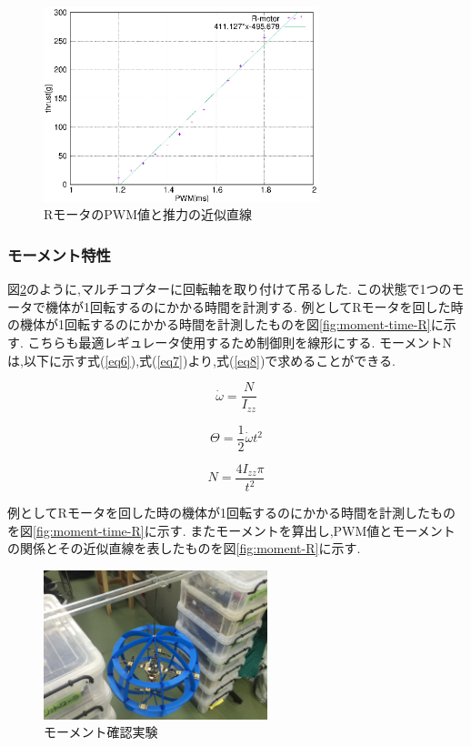 \documentclass[12pt,oneside]{sotsuken_paper}
\begin{document}
\begin{figure}[htbp]
	\begin{center}
		\includegraphics[width=80mm]{image/thrust/thrust-R-kinji.eps}
		\caption{RモータのPWM値と推力の近似直線}
		\label{fig:thrust-R-kinji}
	\end{center}
\end{figure}

\subsubsection{モーメント特性}
図\ref{fig:moment-test}のように,マルチコプターに回転軸を取り付けて吊るした.
この状態で1つのモータで機体が1回転するのにかかる時間を計測する.
例としてRモータを回した時の機体が1回転するのにかかる時間を計測したものを図\ref{fig:moment-time-R}に示す.
こちらも最適レギュレータ使用するため制御則を線形にする.
モーメントNは,以下に示す式(\ref{eq6}),式(\ref{eq7})より,式(\ref{eq8})で求めることができる.

\begin{equation}
	\dot{\omega} = \frac{N}{I_{zz}}
	\label{eq6}
\end{equation}

\begin{equation}
	\Theta = \frac{1}{2}\dot{\omega}{t^2}
	\label{eq7}
\end{equation}

\begin{equation}
	N = \frac{4{I_{zz}}\pi}{t^2}
	\label{eq8}
\end{equation}


例としてRモータを回した時の機体が1回転するのにかかる時間を計測したものを図\ref{fig:moment-time-R}に示す.
またモーメントを算出し,PWM値とモーメントの関係とその近似直線を表したものを図\ref{fig:moment-R}に示す.

\begin{figure}[htbp]
	\begin{center}
		\includegraphics[width=65mm]{image/moment/moment-test.jpg}
		\caption{モーメント確認実験}
		\label{fig:moment-test}
	\end{center}
\end{figure}
\end{document}
